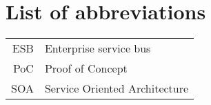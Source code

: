 \documentclass[english,master,unicode,bw]{ctufit-thesis}
\theoremstyle{plain}
\theoremstyle{definition}
\theoremstyle{remark}
\numberwithin{theorem}{chapter}
\begin{document}






\chapter{List of abbreviations}
\begin{tabular}{rl}
    ESB   & Enterprise service bus                 \\
    PoC   & Proof of Concept                 \\
    SOA   & Service Oriented Architecture                 \\
\end{tabular}
\end{document}
